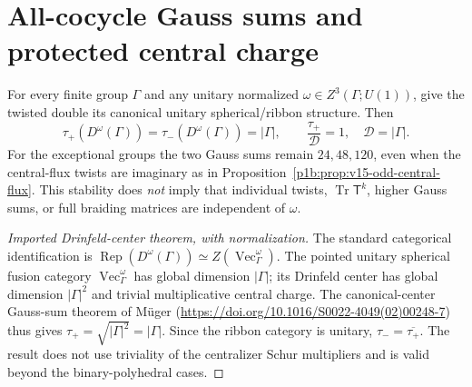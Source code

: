 \documentclass[11pt]{article}
\begin{document}
\section{All-cocycle Gauss sums and protected central charge}
\label{p1b:sec:v16-all-twist-gauss}
\begin{theorem}
\label{p1b:thm:v16-all-twist-gauss}
For every finite group $\Gamma$ and any unitary normalized
$\omega\in Z^3(\Gamma;U(1))$, give the twisted double
its canonical unitary spherical/ribbon structure. Then
\begin{equation}
\boxed{\tau_+(D^\omega(\Gamma))
 =\tau_-(D^\omega(\Gamma))=|\Gamma|,
 \qquad \frac{\tau_+}{\mathcal D}=1,
 \quad\mathcal D=|\Gamma|.}
\tag{T16.8}\label{p1b:eq:v16-all-twist-gauss}
\end{equation}
For the exceptional groups the two Gauss sums remain
$24,48,120$, even when the central-flux twists are imaginary
as in Proposition~\ref{p1b:prop:v15-odd-central-flux}.
This stability does \emph{not} imply that individual twists,
$\operatorname{Tr}\mathsf T^k$, higher Gauss sums, or full
braiding matrices are independent of $\omega$.
\end{theorem}
\begin{proof}[Imported Drinfeld-center theorem, with normalization]
The standard categorical identification is
$\operatorname{Rep}(D^\omega(\Gamma))
 \simeq Z(\operatorname{Vec}_\Gamma^\omega)$.
The pointed unitary spherical fusion category
$\operatorname{Vec}_\Gamma^\omega$ has global dimension
$|\Gamma|$; its Drinfeld center has global dimension
$|\Gamma|^2$ and trivial multiplicative central charge.
The canonical-center Gauss-sum theorem of M\"uger
(\url{https://doi.org/10.1016/S0022-4049(02)00248-7}) thus gives
$\tau_+=\sqrt{|\Gamma|^2}=|\Gamma|$.
Since the ribbon category is unitary, $\tau_-=\overline{\tau_+}$.
The result does not use triviality of the centralizer Schur
multipliers and is valid beyond the binary-polyhedral cases.
\end{proof}
\end{document}
